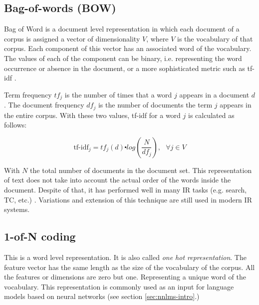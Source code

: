 
 \subsection{Bag-of-words (BOW)}
 \label{sec:rel_bow}

Bag of Word is a document level representation in which each document of a corpus is assigned a vector of dimensionality $V$, where $V$ is the
vocabulary of that corpus. Each component of this vector has an associated word of
the vocabulary. The values of each of the component can be binary, i.e. representing the
word occurrence or absence in the document, or a more sophisticated metric
such as \ac{tf-idf} \cite{Salton88term-weightingapproaches}.


Term frequency $tf_j$  is the number of times that a word $j$ appears in a
document $d$. The document frequency  $df_{j}$  is the number of documents
the term $j$ appears in the entire corpus.  With these two values,  \ac{tf-idf}  for a  word $j$ is  calculated as follows:

\begin{equation*}
  \label{eq:tf-idf}
  \text{tf-idf}_{j}=tf_{j}(d)\centerdot log(\frac{N}{df_{j}}),\,\,\,\,\forall
  j \in V
\end{equation*}

With $N$ the total number of documents in the document set.  This representation of text does not take  into account the actual order of the words inside the document. Despite
of that, it has  performed well in many \ac{IR} tasks (e.g. search, \ac{TC},
etc.) \cite{Sebastiani02}. Variations and extension of this technique are
still used in modern \ac{IR} systems.

 \subsection{1-of-N coding}
 \label{sec:1_of_coding}

 This is a word level representation. It is also called \textit{one hot
   representation}. The feature vector has the same length as the size of the
 vocabulary of the corpus. All the features or dimensions are zero but one.
 Representing a unique word of the vocabulary.            This representation is
 commonly used as an input for language models based on neural networks (see
 section \ref{sec:nnlms-intro}.)


